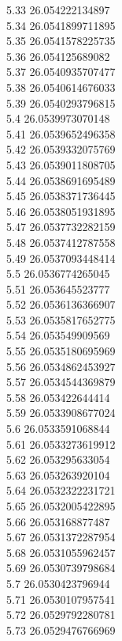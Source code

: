 {5.33	26.054222134897\\
5.34	26.0541899711895\\
5.35	26.0541578225735\\
5.36	26.054125689082\\
5.37	26.0540935707477\\
5.38	26.0540614676033\\
5.39	26.0540293796815\\
5.4	26.0539973070148\\
5.41	26.0539652496358\\
5.42	26.0539332075769\\
5.43	26.0539011808705\\
5.44	26.0538691695489\\
5.45	26.0538371736445\\
5.46	26.0538051931895\\
5.47	26.0537732282159\\
5.48	26.0537412787558\\
5.49	26.0537093448414\\
5.5	26.0536774265045\\
5.51	26.053645523777\\
5.52	26.0536136366907\\
5.53	26.0535817652775\\
5.54	26.053549909569\\
5.55	26.0535180695969\\
5.56	26.0534862453927\\
5.57	26.0534544369879\\
5.58	26.053422644414\\
5.59	26.0533908677024\\
5.6	26.0533591068844\\
5.61	26.0533273619912\\
5.62	26.053295633054\\
5.63	26.053263920104\\
5.64	26.0532322231721\\
5.65	26.0532005422895\\
5.66	26.053168877487\\
5.67	26.0531372287954\\
5.68	26.0531055962457\\
5.69	26.0530739798684\\
5.7	26.0530423796944\\
5.71	26.0530107957541\\
5.72	26.0529792280781\\
5.73	26.0529476766969\\
}
